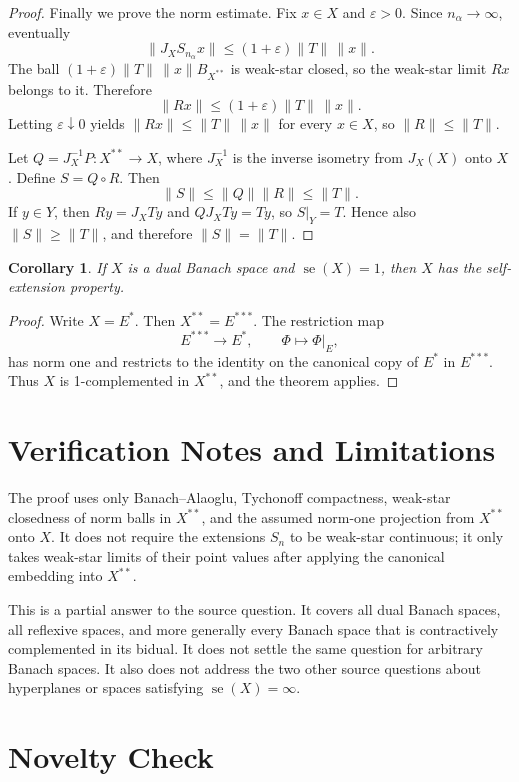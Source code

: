 \documentclass[11pt]{article}
\newtheorem{corollary}[theorem]{Corollary}
\DeclareMathOperator{\se}{se}
\begin{document}
\begin{proof}
Finally we prove the norm estimate. Fix $x\in X$ and $\varepsilon>0$. Since
$n_\alpha\to\infty$, eventually
\[
  \|J_XS_{n_\alpha}x\|\leq (1+\varepsilon)\|T\|\,\|x\|.
\]
The ball $(1+\varepsilon)\|T\|\,\|x\|B_{X^{**}}$ is weak-star closed, so the
weak-star limit $Rx$ belongs to it. Therefore
\[
  \|Rx\|\leq (1+\varepsilon)\|T\|\,\|x\|.
\]
Letting $\varepsilon\downarrow 0$ yields $\|Rx\|\leq \|T\|\,\|x\|$ for every
$x\in X$, so $\|R\|\leq\|T\|$.

Let $Q=J_X^{-1}P:X^{**}\to X$, where $J_X^{-1}$ is the inverse isometry from
$J_X(X)$ onto $X$. Define $S=Q\circ R$. Then
\[
  \|S\|\leq \|Q\|\|R\|\leq \|T\|.
\]
If $y\in Y$, then $Ry=J_XTy$ and $QJ_XTy=Ty$, so $S|_Y=T$. Hence also
$\|S\|\geq \|T\|$, and therefore $\|S\|=\|T\|$.
\end{proof}

\begin{corollary}
If $X$ is a dual Banach space and $\se(X)=1$, then $X$ has the self-extension
property.
\end{corollary}

\begin{proof}
Write $X=E^*$. Then $X^{**}=E^{***}$. The restriction map
\[
  E^{***}\longrightarrow E^*,\qquad \Phi\mapsto \Phi|_E,
\]
has norm one and restricts to the identity on the canonical copy of $E^*$ in
$E^{***}$. Thus $X$ is 1-complemented in $X^{**}$, and the theorem applies.
\end{proof}

\section*{Verification Notes and Limitations}

The proof uses only Banach--Alaoglu, Tychonoff compactness, weak-star
closedness of norm balls in $X^{**}$, and the assumed norm-one projection from
$X^{**}$ onto $X$. It does not require the extensions $S_n$ to be weak-star
continuous; it only takes weak-star limits of their point values after applying
the canonical embedding into $X^{**}$.

This is a partial answer to the source question. It covers all dual Banach
spaces, all reflexive spaces, and more generally every Banach space that is
contractively complemented in its bidual. It does not settle the same question
for arbitrary Banach spaces. It also does not address the two other source
questions about hyperplanes or spaces satisfying $\se(X)=\infty$.

\section*{Novelty Check}
\end{document}
